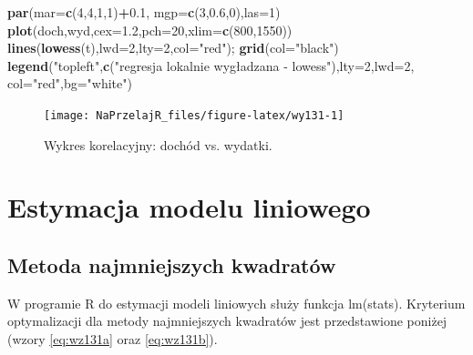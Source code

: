 \documentclass[polish,]{book}
\newenvironment{Shaded}{\begin{snugshade}}{\end{snugshade}}
\newcommand{\DataTypeTok}[1]{\textcolor[rgb]{0.13,0.29,0.53}{#1}}
\newcommand{\DecValTok}[1]{\textcolor[rgb]{0.00,0.00,0.81}{#1}}
\newcommand{\FloatTok}[1]{\textcolor[rgb]{0.00,0.00,0.81}{#1}}
\newcommand{\KeywordTok}[1]{\textcolor[rgb]{0.13,0.29,0.53}{\textbf{#1}}}
\newcommand{\NormalTok}[1]{#1}
\newcommand{\OperatorTok}[1]{\textcolor[rgb]{0.81,0.36,0.00}{\textbf{#1}}}
\newcommand{\StringTok}[1]{\textcolor[rgb]{0.31,0.60,0.02}{#1}}
\begin{document}
\begin{Shaded}
\begin{Highlighting}[]
\KeywordTok{par}\NormalTok{(}\DataTypeTok{mar=}\KeywordTok{c}\NormalTok{(}\DecValTok{4}\NormalTok{,}\DecValTok{4}\NormalTok{,}\DecValTok{1}\NormalTok{,}\DecValTok{1}\NormalTok{)}\OperatorTok{+}\FloatTok{0.1}\NormalTok{, }\DataTypeTok{mgp=}\KeywordTok{c}\NormalTok{(}\DecValTok{3}\NormalTok{,}\FloatTok{0.6}\NormalTok{,}\DecValTok{0}\NormalTok{),}\DataTypeTok{las=}\DecValTok{1}\NormalTok{)}
\KeywordTok{plot}\NormalTok{(doch,wyd,}\DataTypeTok{cex=}\FloatTok{1.2}\NormalTok{,}\DataTypeTok{pch=}\DecValTok{20}\NormalTok{,}\DataTypeTok{xlim=}\KeywordTok{c}\NormalTok{(}\DecValTok{800}\NormalTok{,}\DecValTok{1550}\NormalTok{))}
\KeywordTok{lines}\NormalTok{(}\KeywordTok{lowess}\NormalTok{(t),}\DataTypeTok{lwd=}\DecValTok{2}\NormalTok{,}\DataTypeTok{lty=}\DecValTok{2}\NormalTok{,}\DataTypeTok{col=}\StringTok{"red"}\NormalTok{); }\KeywordTok{grid}\NormalTok{(}\DataTypeTok{col=}\StringTok{"black"}\NormalTok{)}
\KeywordTok{legend}\NormalTok{(}\StringTok{"topleft"}\NormalTok{,}\KeywordTok{c}\NormalTok{(}\StringTok{"regresja lokalnie wygładzana - lowess"}\NormalTok{),}\DataTypeTok{lty=}\DecValTok{2}\NormalTok{,}\DataTypeTok{lwd=}\DecValTok{2}\NormalTok{, }\DataTypeTok{col=}\StringTok{"red"}\NormalTok{,}\DataTypeTok{bg=}\StringTok{"white"}\NormalTok{)}
\end{Highlighting}
\end{Shaded}

\begin{figure}[h]

{\centering \texttt{[image: NaPrzelajR\_files/figure-latex/wy131-1]} 

}

\caption{Wykres korelacyjny: dochód vs. wydatki.}\label{fig:wy131}
\end{figure}

\hypertarget{part_13.2}{%
\section{Estymacja modelu liniowego}\label{part_13.2}}

\hypertarget{part_13.2.1}{%
\subsection{Metoda najmniejszych kwadratów}\label{part_13.2.1}}

W programie R do estymacji modeli liniowych służy funkcja lm(stats). Kryterium
optymalizacji dla metody najmniejszych kwadratów jest przedstawione poniżej (wzory \eqref{eq:wz131a} oraz \eqref{eq:wz131b}).
\end{document}

